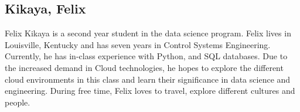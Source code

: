 \subsection{Kikaya, Felix}
Felix Kikaya is a second year student in the data science program. Felix lives in Louisville,
Kentucky and has seven years in Control Systems Engineering. 
Currently, he has in-class experience with Python, and SQL databases. 
Due to the increased demand in Cloud technologies, he hopes to explore the different cloud environments in this class
and learn their significance in data science and engineering. During free time, Felix loves to travel, 
explore different cultures and people.


